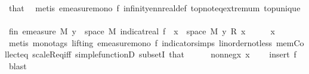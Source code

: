 \begin{isabellebody}
\ that\ \isamarkupfalse%
\ {\isacharparenleft}{\kern0pt}metis\ emeasure{\isacharunderscore}{\kern0pt}mono\ f{\isacharparenleft}{\kern0pt}{}{\isacharparenright}{\kern0pt}\ infinity{\isacharunderscore}{\kern0pt}ennreal{\isacharunderscore}{\kern0pt}def\ top{\isachardot}{\kern0pt}not{\isacharunderscore}{\kern0pt}eq{\isacharunderscore}{\kern0pt}extremum\ top{\isacharunderscore}{\kern0pt}unique{\isacharparenright}{\kern0pt}\isanewline
\ \ \ \ \isamarkupfalse%
\ fin{\isacharunderscore}{\kern0pt}{}{\isacharcolon}{\kern0pt}\ {\isachardoublequoteopen}emeasure\ M\ {\isacharbraceleft}{\kern0pt}y\ {\isasymin}\ space\ M{\isachardot}{\kern0pt}\ indicat{\isacharunderscore}{\kern0pt}real\ {\isacharparenleft}{\kern0pt}f\ {\isacharminus}{\kern0pt}{\isacharbackquote}{\kern0pt}\ {\isacharbraceleft}{\kern0pt}x{\isacharbraceright}{\kern0pt}\ {\isasyminter}\ space\ M{\isacharparenright}{\kern0pt}\ y\ {\isacharasterisk}{\kern0pt}\isactrlsub R\ x\ {\isasymnoteq}\ {}{\isacharbraceright}{\kern0pt}\ {\isasymnoteq}\ {\isasyminfinity}{\isachardoublequoteclose}\ \ {\isachardoublequoteopen}x\ {\isasymnoteq}\ {}{\isachardoublequoteclose}\ \isamarkupfalse%
\ {\isacharparenleft}{\kern0pt}metis\ {\isacharparenleft}{\kern0pt}mono{\isacharunderscore}{\kern0pt}tags{\isacharcomma}{\kern0pt}\ lifting{\isacharparenright}{\kern0pt}\ emeasure{\isacharunderscore}{\kern0pt}mono\ f{\isacharparenleft}{\kern0pt}{}{\isacharparenright}{\kern0pt}\ indicator{\isacharunderscore}{\kern0pt}simps{\isacharparenleft}{\kern0pt}{}{\isacharparenright}{\kern0pt}\ linorder{\isacharunderscore}{\kern0pt}not{\isacharunderscore}{\kern0pt}less\ mem{\isacharunderscore}{\kern0pt}Collect{\isacharunderscore}{\kern0pt}eq\ scaleR{\isacharunderscore}{\kern0pt}eq{\isacharunderscore}{\kern0pt}{}{\isacharunderscore}{\kern0pt}iff\ simple{\isacharunderscore}{\kern0pt}functionD{\isacharparenleft}{\kern0pt}{}{\isacharparenright}{\kern0pt}\ subsetI\ that{\isacharparenright}{\kern0pt}\isanewline
\isanewline
\ \ \ \ \isamarkupfalse%
\ nonneg{\isacharunderscore}{\kern0pt}x{\isacharcolon}{\kern0pt}\ {\isachardoublequoteopen}x\ {\isasymge}\ {}{\isachardoublequoteclose}\ \isamarkupfalse%
\ insert\ f\ \isamarkupfalse%
\ blast\isanewline
\ \ \ \ \isamarkupfalse%

\end{isabellebody}
